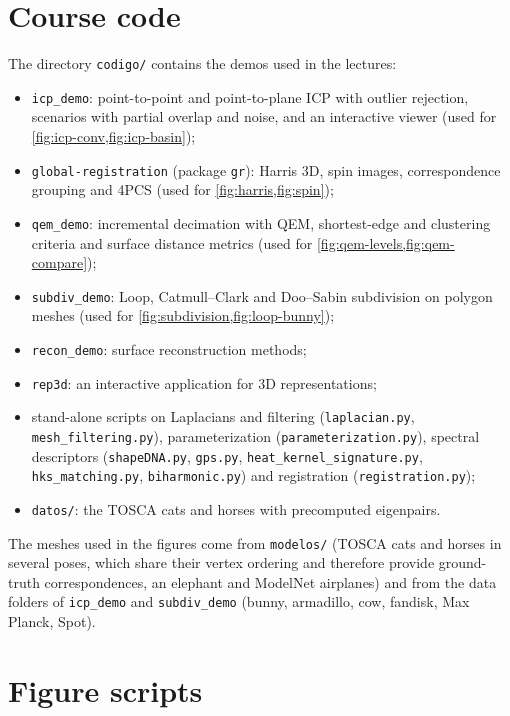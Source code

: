 \section{Course code}

The directory \texttt{codigo/} contains the demos used in the lectures:
\begin{itemize}
  \item \texttt{icp\_demo}: point-to-point and point-to-plane ICP with outlier rejection, scenarios with
  partial overlap and noise, and an interactive viewer (used for \cref{fig:icp-conv,fig:icp-basin});
  \item \texttt{global-registration} (package \texttt{gr}): Harris 3D, spin images, correspondence
  grouping and 4PCS (used for \cref{fig:harris,fig:spin});
  \item \texttt{qem\_demo}: incremental decimation with QEM, shortest-edge and clustering criteria and
  surface distance metrics (used for \cref{fig:qem-levels,fig:qem-compare});
  \item \texttt{subdiv\_demo}: Loop, Catmull--Clark and Doo--Sabin subdivision on polygon meshes (used for
  \cref{fig:subdivision,fig:loop-bunny});
  \item \texttt{recon\_demo}: surface reconstruction methods;
  \item \texttt{rep3d}: an interactive application for 3D representations;
  \item \sloppy stand-alone scripts on Laplacians and filtering (\texttt{laplacian.py},
  \texttt{mesh\_filtering.py}), parameterization (\texttt{parameterization.py}), spectral descriptors
  (\texttt{shapeDNA.py}, \texttt{gps.py}, \texttt{heat\_kernel\_signature.py},
  \texttt{hks\_matching.py}, \texttt{biharmonic.py}) and registration (\texttt{registration.py});
  \item \texttt{datos/}: the TOSCA cats and horses with precomputed eigenpairs.
\end{itemize}
The meshes used in the figures come from \texttt{modelos/} (TOSCA cats and horses in several poses,
which share their vertex ordering and therefore provide ground-truth correspondences, an elephant and
ModelNet airplanes) and from the data folders of \texttt{icp\_demo} and \texttt{subdiv\_demo} (bunny,
armadillo, cow, fandisk, Max Planck, Spot).

\section{Figure scripts}

